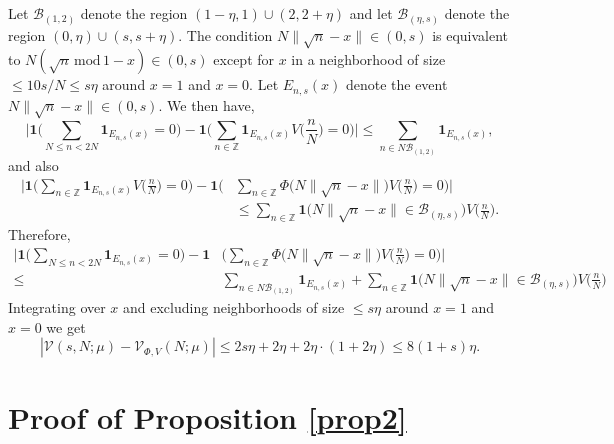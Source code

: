 \documentclass[12pt,reqno]{amsart}
\theoremstyle{plain}
\numberwithin{equation}{section}
\numberwithin{figure}{section}
\theoremstyle{plain}
\theoremstyle{definition}
\theoremstyle{remark}
\newcommand{\mmod}{\,\mathrm{mod}\,}
\begin{document}
Let $\mathcal{B}_{(1,2)}$ denote the region $(1 - \eta, 1) \cup (2, 2 + \eta)$ and let $\mathcal{B}_{(\eta,s)}$ denote the region $(0, \eta) \cup (s, s + \eta)$. The condition $N \| \sqrt{n} - x \| \in (0,s)$ is equivalent to $N (\sqrt{n} \mmod{1} - x) \in (0,s)$ except for $x$ in a neighborhood of size $\leq 10 s / N \leq s \eta$ around $x = 1$ and $x = 0$. Let $E_{n, s}(x)$ denote the event $N \| \sqrt{n} - x \| \in (0,s).$
We then have, 
$$
\Big | \mathbf{1} \Big ( \sum_{N \leq n < 2N} \mathbf{1}_{E_{n, s}(x)} = 0 \Big )  - \mathbf{1} \Big ( \sum_{n \in \mathbb{Z}} \mathbf{1}_{E_{n,s}(x)} V \Big ( \frac{n}{N} \Big ) = 0 \Big ) \Big | \leq \sum_{n \in N \mathcal{B}_{(1,2)}} \mathbf{1}_{E_{n,s}(x)},
$$
and also 
\begin{align*}
\Big | \mathbf{1} \Big ( \sum_{n \in \mathbb{Z}} \mathbf{1}_{E_{n,s}(x)} V \Big ( \frac{n}{N} \Big ) = 0 \Big ) - \mathbf{1} \Big ( & \sum_{n \in \mathbb{Z}} \Phi \Big ( N \| \sqrt{n} - x \| \Big ) V \Big ( \frac{n}{N} \Big ) = 0 \Big ) \Big | \\ & \leq \sum_{n \in \mathbb{Z}} \mathbf{1} \Big ( N \| \sqrt{n} - x \| \in \mathcal{B}_{(\eta,s)} \Big ) V \Big ( \frac{n}{N} \Big ).
\end{align*}
Therefore, 
\begin{align*}
\Big | \mathbf{1} \Big ( \sum_{N \leq n < 2N} \mathbf{1}_{E_{n, s}(x)} = 0 \Big )  - \mathbf{1} & \Big ( \sum_{n \in \mathbb{Z}} \Phi \Big ( N \| \sqrt{n} - x \| \Big ) V \Big ( \frac{n}{N} \Big ) = 0 \Big )  \Big | \\ \leq &  \sum_{n \in N \mathcal{B}_{(1,2)}} \mathbf{1}_{E_{n,s}(x)} + \sum_{n \in \mathbb{Z}} \mathbf{1} \Big ( N \| \sqrt{n} - x \| \in \mathcal{B}_{(\eta,s)} \Big ) V \Big ( \frac{n}{N} \Big )
\end{align*}
Integrating over $x$ and excluding neighborhoods of size $\leq s \eta$ around $x = 1$ and $x = 0$ we get 
$$
|\mathcal{V}(s, N; \mu) - \mathcal{V}_{\Phi, V}(N; \mu)| \leq 2 s \eta + 2 \eta + 2 \eta \cdot (1 + 2 \eta) \leq 8 (1 + s) \eta.
$$

\section{Proof of Proposition \ref{prop2}}
\end{document}
